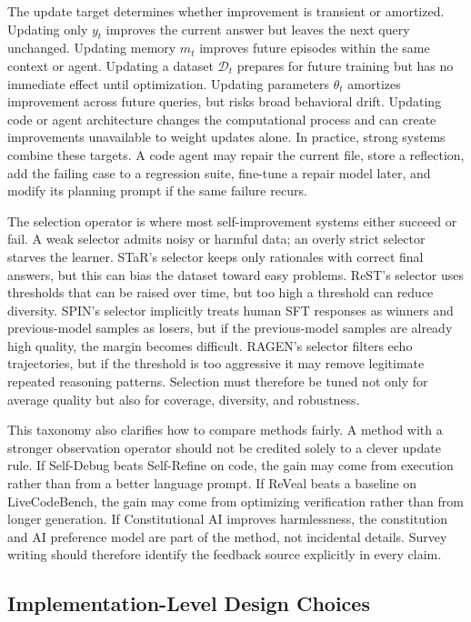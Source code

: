 The update target determines whether improvement is transient or amortized. Updating only $y_t$ improves the current answer but leaves the next query unchanged. Updating memory $m_t$ improves future episodes within the same context or agent. Updating a dataset $\mathcal{D}_t$ prepares for future training but has no immediate effect until optimization. Updating parameters $\theta_t$ amortizes improvement across future queries, but risks broad behavioral drift. Updating code or agent architecture changes the computational process and can create improvements unavailable to weight updates alone. In practice, strong systems combine these targets. A code agent may repair the current file, store a reflection, add the failing case to a regression suite, fine-tune a repair model later, and modify its planning prompt if the same failure recurs.

The selection operator is where most self-improvement systems either succeed or fail. A weak selector admits noisy or harmful data; an overly strict selector starves the learner. STaR's selector keeps only rationales with correct final answers, but this can bias the dataset toward easy problems. ReST's selector uses thresholds that can be raised over time, but too high a threshold can reduce diversity. SPIN's selector implicitly treats human SFT responses as winners and previous-model samples as losers, but if the previous-model samples are already high quality, the margin becomes difficult. RAGEN's selector filters echo trajectories, but if the threshold is too aggressive it may remove legitimate repeated reasoning patterns. Selection must therefore be tuned not only for average quality but also for coverage, diversity, and robustness.

This taxonomy also clarifies how to compare methods fairly. A method with a stronger observation operator should not be credited solely to a clever update rule. If Self-Debug beats Self-Refine on code, the gain may come from execution rather than from a better language prompt. If ReVeal beats a baseline on LiveCodeBench, the gain may come from optimizing verification rather than from longer generation. If Constitutional AI improves harmlessness, the constitution and AI preference model are part of the method, not incidental details. Survey writing should therefore identify the feedback source explicitly in every claim.

\subsection{Implementation-Level Design Choices}
\label{subsec:implementation-design-choices}


